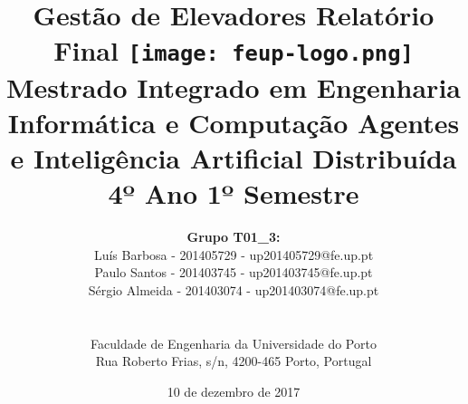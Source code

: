 ﻿\documentclass[a4paper]{article}
\begin{document}
\setlength{\textwidth}{16cm}
\setlength{\textheight}{22cm}

\title{\Huge\textbf{Gestão de Elevadores}\linebreak\linebreak\linebreak
\Large\textbf{Relatório Final}\linebreak\linebreak
\linebreak\linebreak
\texttt{[image: feup-logo.png]}\linebreak\linebreak
\linebreak\linebreak
\Large{Mestrado Integrado em Engenharia Informática e Computação} \linebreak\linebreak
\Large{Agentes e Inteligência Artificial Distribuída}\linebreak
\Large{4º Ano 1º Semestre}\linebreak\linebreak
}

\author{\textbf{Grupo T01\_3:}\\ Luís  Barbosa - 201405729 - up201405729@fe.up.pt\\ Paulo Santos - 201403745 - up201403745@fe.up.pt \\ Sérgio Almeida  - 201403074 - up201403074@fe.up.pt \\\linebreak\linebreak \\
 \\ Faculdade de Engenharia da Universidade do Porto \\ Rua Roberto Frias, s/n, 4200-465 Porto, Portugal \linebreak\linebreak\linebreak
\linebreak\linebreak\vspace{1cm}}
\date{10 de dezembro de 2017}
\maketitle
\thispagestyle{empty}

\end{document}
